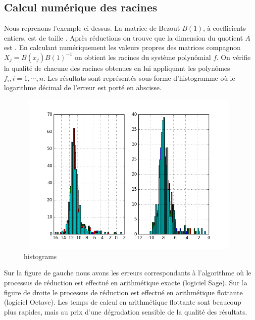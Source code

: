 \documentclass{standalone}
\begin{document}
  \subsection{Calcul numérique des racines}
  Nous reprenons l'exemple ci-dessus. La matrice de Bezout $B(1)$, à coefficients entiers, est de taille . Après réductions on trouve que la dimension du quotient $A$ est . En calculant numériquement les valeurs propres des matrices compagnon $X_j = B(x_j)B(1)^{-1}$ on obtient les racines du système polynômial $f$. On vérifie la qualité de chacune des racines obtenues en lui appliquant les polynômes $f_i, i=1,\cdots,n$. Les résultats sont représentés sous forme d'histogramme o\`u le logarithme décimal de l'erreur est porté en abscisse.
\begin{figure}[!ht]
  \includegraphics[height=8cm, width=1.2\textwidth]{../png/roots.png}
  \caption{histograms}
\end{figure}
Sur la figure de gauche nous avons les erreurs correspondants à l'algorithme o\`u le processus de réduction est effectué en arithmétique exacte (logiciel Sage). Sur la figure de droite le processus de réduction est effectué en arithmétique flottante (logiciel Octave).
Les temps de calcul en arithmétique flottante sont beaucoup plus rapides, mais au prix d'une dégradation sensible de la qualité des résultats.
\end{document}
